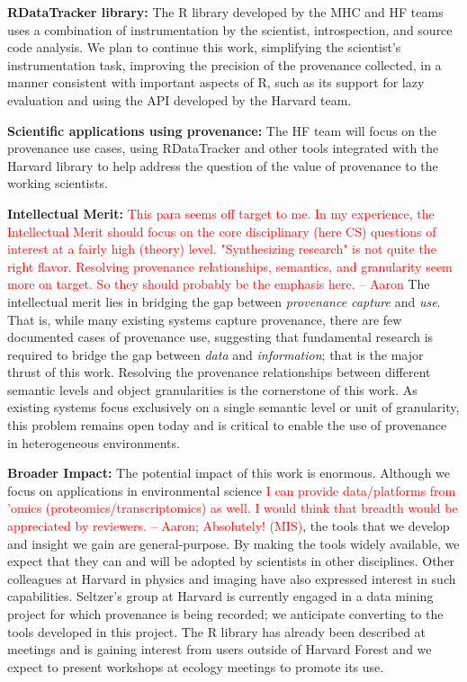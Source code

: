\documentclass[10pt]{article}
\newcommand{\todo}[1]{\textcolor{red}{#1}}
\begin{document}
\textbf{RDataTracker library:}  The R library developed by the MHC
and HF teams uses a combination of instrumentation by the scientist,
introspection, and source code analysis.  We plan to continue this
work, simplifying the scientist's instrumentation task, improving
the precision of the provenance collected, in a manner consistent
with important aspects of R, such as its support for lazy evaluation
and using the API developed by the Harvard team.

\textbf{Scientific applications using provenance:}  The HF team
will focus on the provenance use cases, using RDataTracker and other
tools integrated with the Harvard library to help address the
question of the value of provenance to the working scientists.

\textbf{Intellectual Merit: }
\todo{This para seems off target to me. In my experience, the Intellectual Merit should focus on the core disciplinary (here CS) questions of interest at a fairly high (theory) level. "Synthesizing research" is not quite the right flavor. Resolving provenance relationships, semantics, and granularity seem more on target. So they should probably be the emphasis here. -- Aaron}
The intellectual merit lies in bridging the gap between \emph{provenance
capture} and \emph{use}.
That is, while many existing systems capture provenance, there are few
documented cases of provenance use, suggesting that fundamental research
is required to bridge the gap between \emph{data} and \emph{information};
that is the major thrust of this work.
Resolving the provenance relationships between different semantic levels
and object granularities is the cornerstone of this work.
As existing systems focus exclusively on a single semantic level or
unit of granularity, this problem remains open today and is critical
to enable the use of provenance in heterogeneous environments.


\textbf{Broader Impact: }
The potential impact of this work is enormous.  Although we focus
on applications in environmental science
\todo{I can provide
data/platforms from 'omics (proteomics/transcriptomics) as well. I
would think that breadth would be appreciated by reviewers. --
Aaron; Absolutely! (MIS)},
the tools that we develop and insight we gain are general-purpose.
By making the tools widely available, we expect that
they can and will be adopted by scientists in other
disciplines.  Other colleagues at Harvard in physics and imaging
have also expressed interest in such capabilities.  Seltzer's group
at Harvard is currently engaged in a data mining project for which
provenance is being recorded; we anticipate converting
to the tools developed in this project.
The R library has already
been described at meetings and is gaining interest from users outside
of Harvard Forest and we expect to present workshops at ecology
meetings to promote its use.
\end{document}
